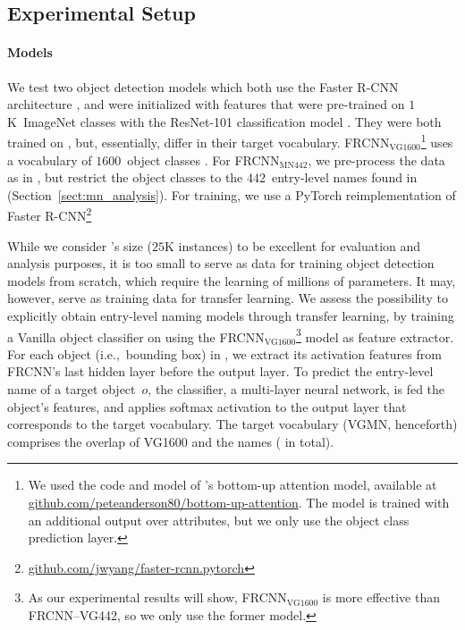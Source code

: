 \subsection{Experimental Setup}
\label{sect:exp_setup}

\paragraph{Models}
We test two object detection models which both use the Faster R-CNN architecture \cite{fasterrcnn2015}, and were initialized with features that were pre-trained on $1$K~ImageNet classes with the ResNet-101 classification model \cite{he2016deep}. 
They were both trained on \vg, but, essentially, differ in their target vocabulary. 
FRCNN$_{\text{VG1600}}$\footnote{We used the code and model of \citeauthor{anderson2018updown}'s  bottom-up attention model, available at  \url{github.com/peteanderson80/bottom-up-attention}. The model is trained with an additional output over attributes, but we only use the object class prediction layer.} \cite{anderson2018updown} uses a vocabulary of $1600$~object classes .
For FRCNN$_{\text{MN442}}$, we pre-process the \vg data as in \citeauthor{anderson2018updown} , but restrict the object classes to the $442$~entry-level names found in \mn (Section~\ref{sect:mn_analysis}). 
For training, we use a PyTorch reimplementation of Faster R-CNN\footnote{\url{github.com/jwyang/faster-rcnn.pytorch}}

While we consider \mn's size ($25$K instances) to be excellent for evaluation and analysis purposes, it is too small to serve as data for training object detection models from scratch, which require the learning of millions of parameters. 
It may, however, serve as training data for transfer learning. 
We assess the possibility to explicitly obtain entry-level naming models through transfer learning, by training a Vanilla object classifier on \mn using the FRCNN$_{\text{VG1600}}$\footnote{As our experimental results will show, FRCNN$_{\text{VG1600}}$ is more effective than FRCNN--VG442, so we only use the former model.} model as feature extractor. 
For each object (i.e.,~bounding box) in \mn, we extract its activation features from FRCNN's last hidden layer before the output layer. 
To predict the entry-level name of a target object~$o$, the classifier, a multi-layer neural network, is fed the object's features, and applies softmax activation to the output layer that corresponds to the target vocabulary. 
The target vocabulary (VGMN, henceforth) comprises the overlap of VG1600 and the \mn names ( in total). 

